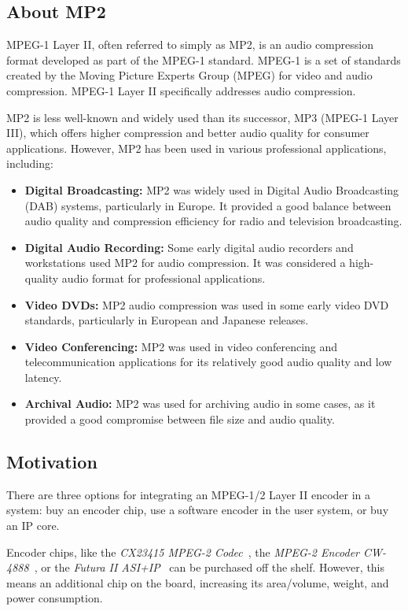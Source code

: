 \subsection{About MP2}

MPEG-1 Layer II, often referred to simply as MP2, is an audio compression format developed as part of the MPEG-1 standard. MPEG-1 is a set of standards created by the Moving Picture Experts Group (MPEG) for video and audio compression. MPEG-1 Layer II specifically addresses audio compression.

MP2 is less well-known and widely used than its successor, MP3 (MPEG-1 Layer III), which offers higher compression and better audio quality for consumer applications. However, MP2 has been used in various professional applications, including:

\begin{itemize}
    \item \textbf{Digital Broadcasting:} MP2 was widely used in Digital Audio Broadcasting (DAB) systems, particularly in Europe. It provided a good balance between audio quality and compression efficiency for radio and television broadcasting.
    \item \textbf{Digital Audio Recording:} Some early digital audio recorders and workstations used MP2 for audio compression. It was considered a high-quality audio format for professional applications.
    \item \textbf{Video DVDs:} MP2 audio compression was used in some early video DVD standards, particularly in European and Japanese releases.
    \item \textbf{Video Conferencing:} MP2 was used in video conferencing and telecommunication applications for its relatively good audio quality and low latency.
    \item \textbf{Archival Audio:} MP2 was used for archiving audio in some cases, as it provided a good compromise between file size and audio quality.
\end{itemize}



\subsection{Motivation}

There are three options for integrating an MPEG-1/2 Layer II encoder in a system: buy an encoder chip, use a software encoder in the user system, or buy an IP core.

Encoder chips, like the \textit{CX23415 MPEG-2 Codec}~\cite{cx23415}, the \textit{MPEG-2 Encoder CW-4888}~\cite{cw4888}, or the \textit{Futura II ASI+IP}~\cite{futura} can be purchased off the shelf. However, this means an additional chip on the board, increasing its area/volume, weight, and power consumption.

